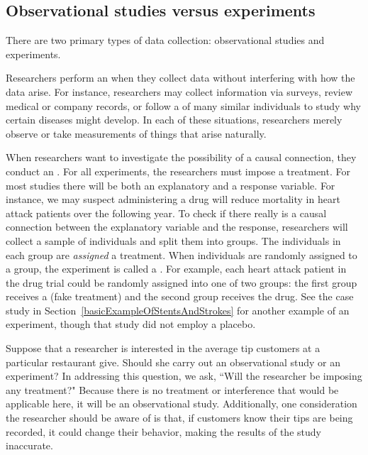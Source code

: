 \subsection{Observational studies versus experiments}

There are two primary types of data collection: observational studies and experiments.

Researchers perform an  when they collect data without interfering with how the data arise. For instance, researchers may collect information via surveys, review medical or company records, or follow a  of many similar individuals to study why certain diseases might develop. In each of these situations, researchers merely observe or take measurements of things that arise naturally.

When researchers want to investigate the possibility of a causal connection, they conduct an . For all experiments, the researchers must impose a treatment. For most studies there will be both an explanatory and a response variable. For instance, we may suspect administering a drug will reduce mortality in heart attack patients over the following year. To check if there really is a causal connection between the explanatory variable and the response, researchers will collect a sample of individuals and split them into groups. The individuals in each group are \emph{assigned} a treatment. When individuals are randomly assigned to a group, the experiment is called a . For example, each heart attack patient in the drug trial could be randomly assigned into one of two groups: the first group receives a  (fake treatment) and the second group receives the drug. See the case study in Section~\ref{basicExampleOfStentsAndStrokes} for another example of an experiment, though that study did not employ a placebo.

\begin{examplewrap}
\begin{nexample}{Suppose that a researcher is interested in the average tip customers at a particular restaurant give. Should she carry out an observational study or an experiment?}
In addressing this question, we ask, ``Will the researcher be imposing any treatment?"  Because there is no treatment or interference that would be applicable here, it will be an observational study. Additionally, one consideration the researcher should be aware of is that, if customers know their tips are being recorded, it could change their behavior, making the results of the study inaccurate.
\end{nexample}
\end{examplewrap}

